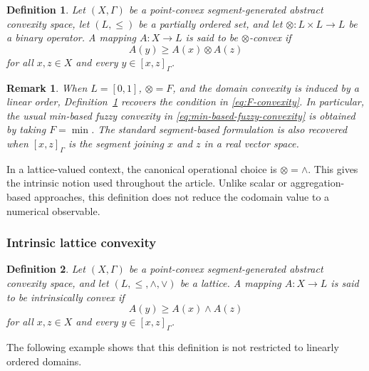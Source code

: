 \documentclass[11pt,a4paper]{article}
\newtheorem{remark}{Remark}
\newtheorem{definition}{Definition}
\begin{document}
\begin{definition}\label{defLconvex}
Let \((X,\Gamma)\) be a point-convex segment-generated abstract convexity space, let \((L,\leq)\) be a partially ordered set, and let \(\otimes:L\times L\to L\) be a binary operator. A mapping \(A:X\to L\) is said to be \emph{\(\otimes\)-convex} if
\begin{equation*}
A(y)\ge A(x)\otimes A(z)
\end{equation*}
for all \(x,z\in X\) and every \(y\in[x,z]_{\Gamma}\).
\end{definition}




\begin{remark}
When \(L=[0,1]\), \(\otimes=F\), and the domain convexity is induced by a linear order, Definition~\ref{defLconvex} recovers the condition in \eqref{eq:F-convexity}. In particular, the usual min-based fuzzy convexity in \eqref{eq:min-based-fuzzy-convexity} is obtained by taking \(F=\min\). The standard segment-based formulation is also recovered when \([x,z]_{\Gamma}\) is the segment joining \(x\) and \(z\) in a real vector space.
\end{remark}




\smallskip

In a lattice-valued context, the canonical operational choice is \(\otimes=\wedge\). This gives the intrinsic notion used throughout the article. Unlike scalar or aggregation-based approaches, this definition does not reduce the codomain value to a numerical observable.





\subsubsection{Intrinsic lattice convexity}

\smallskip

\begin{definition}\label{defintrinsic}
Let \((X,\Gamma)\) be a point-convex segment-generated abstract convexity space, and let \((L,\leq,\wedge,\vee)\) be a lattice. A mapping \(A:X\to L\) is said to be \emph{intrinsically convex} if
\begin{equation*}
A(y)\ge A(x)\wedge A(z)
\end{equation*}
for all \(x,z\in X\) and every \(y\in[x,z]_{\Gamma}\).
\end{definition}

The following example shows that this definition is not restricted to linearly ordered domains.
\end{document}
